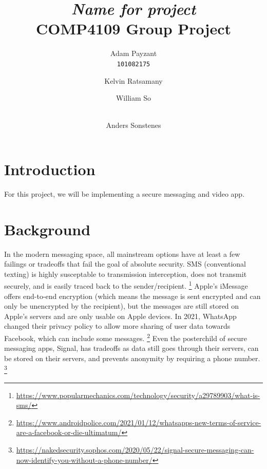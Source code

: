 \documentclass[titlepage]{article}
\title{\textit{Name for project} \\
    \large COMP4109 Group Project
}
\author{Adam Payzant \\ 
    \texttt{101082175} \\
    \and
    Kelvin Ratsamany \\
    \texttt{}
    \and
    William So \\ 
    \texttt{} \\
    \and
    Anders Sonstenes \\ 
    \texttt{}
}
\begin{document}
    \maketitle

    \section{Introduction}

    For this project, we will be implementing a secure messaging and video app.

    \section{Background}

    In the modern messaging space, all mainstream options have at least a few failings or tradeoffs that fail the goal of absolute security. 
    SMS (conventional texting) is highly susceptable to transmission interception, does not transmit securely, and is easily traced back to the sender/recipient.
    \footnote{\url{https://www.popularmechanics.com/technology/security/a29789903/what-is-sms/}}
    Apple's iMessage offers end-to-end encryption (which means the message is sent encrypted and can only be unencrypted by the recipient), but the messages are still stored on Apple's servers and are only usable on Apple devices.
    In 2021, WhatsApp changed their privacy policy to allow more sharing of user data towards Facebook, which can include some messages. 
    \footnote{\url{https://www.androidpolice.com/2021/01/12/whatsapps-new-terms-of-service-are-a-facebook-or-die-ultimatum/}}
    Even the posterchild of secure messaging apps, Signal, has tradeoffs as data still goes through their servers, can be stored on their servers, and prevents anonymity by requiring a phone number.
    \footnote{\url{https://nakedsecurity.sophos.com/2020/05/22/signal-secure-messaging-can-now-identify-you-without-a-phone-number/}}\\
\end{document}
